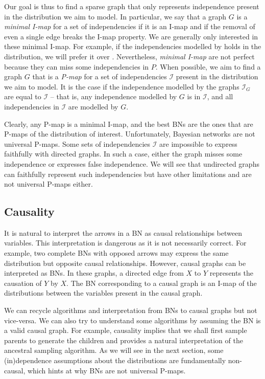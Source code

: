 Our goal is thus to find a sparse graph that only represents independence present in the distribution we aim to model. In particular, we say that a graph $G$ is a \textit{minimal I-map} for a set of independencies if it is an I-map and if the removal of even a single edge breaks the I-map property. We are generally only interested in these minimal I-map. For example, if the independencies modelled by  holds in the distribution, we will prefer it over  . Nevertheless, \textit{minimal I-map} are not perfect because they can miss some independencies in $P$.
When possible, we aim to find a graph $G$ that is a \textit{P-map} for a set of independencies $\mathcal{I}$ present in the distribution we aim to model. It is the case if the independence modelled by the graphs $\mathcal{I}_G$ are equal to $\mathcal{I}$ -- that is, any independence modelled by $G$ is in $\mathcal{I}$, and all independencies in $\mathcal{I}$ are modelled by $G$.

Clearly, any P-map is a minimal I-map, and the best BNs are the ones that are P-maps of the distribution of interest. Unfortunately, Bayesian networks are not universal P-maps. Some sets of independencies $\mathcal{I}$ are impossible to express faithfully with directed graphs. In such a case, either the graph misses some independence or expresses false independence. We will see that undirected graphs can faithfully represent such independencies but have other limitations and are not universal P-maps either.
\subsection{Causality}
It is natural to interpret the arrows in a BN as causal relationships between variables. This interpretation is dangerous as it is not necessarily correct. For example, two complete BNs with opposed arrows may express the same distribution but opposite causal relationships. However, causal graphs can be interpreted as BNs. In these graphs, a directed edge from $X$ to $Y$ represents the causation of $Y$ by $X$. The BN corresponding to a causal graph is an I-map of the distributions between the variables present in the causal graph.

We can recycle algorithms and interpretation from BNs to causal graphs but not vice-versa. We can also try to understand some algorithms by assuming the BN is a valid causal graph. For example, causality implies that we shall first sample parents to generate the children and provides a natural interpretation of the ancestral sampling algorithm. As we will see in the next section, some (in)dependence assumptions about the distributions are fundamentally non-causal, which hints at why BNs are not universal P-maps.


